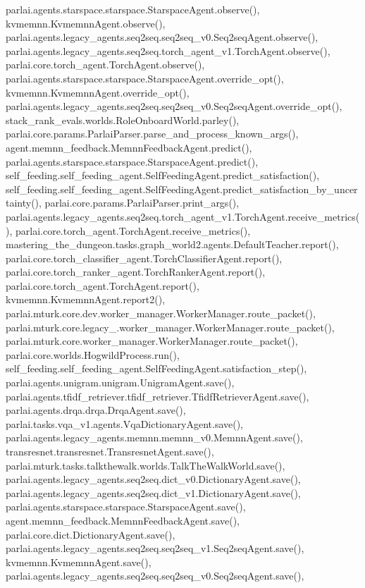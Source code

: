 parlai.\+agents.\+starspace.\+starspace.\+Starspace\+Agent.\+observe(), kvmemnn.\+Kvmemnn\+Agent.\+observe(), parlai.\+agents.\+legacy\+\_\+agents.\+seq2seq.\+seq2seq\+\_\+v0.\+Seq2seq\+Agent.\+observe(), parlai.\+agents.\+legacy\+\_\+agents.\+seq2seq.\+torch\+\_\+agent\+\_\+v1.\+Torch\+Agent.\+observe(), parlai.\+core.\+torch\+\_\+agent.\+Torch\+Agent.\+observe(), parlai.\+agents.\+starspace.\+starspace.\+Starspace\+Agent.\+override\+\_\+opt(), kvmemnn.\+Kvmemnn\+Agent.\+override\+\_\+opt(), parlai.\+agents.\+legacy\+\_\+agents.\+seq2seq.\+seq2seq\+\_\+v0.\+Seq2seq\+Agent.\+override\+\_\+opt(), stack\+\_\+rank\+\_\+evals.\+worlds.\+Role\+Onboard\+World.\+parley(), parlai.\+core.\+params.\+Parlai\+Parser.\+parse\+\_\+and\+\_\+process\+\_\+known\+\_\+args(), agent.\+memnn\+\_\+feedback.\+Memnn\+Feedback\+Agent.\+predict(), parlai.\+agents.\+starspace.\+starspace.\+Starspace\+Agent.\+predict(), self\+\_\+feeding.\+self\+\_\+feeding\+\_\+agent.\+Self\+Feeding\+Agent.\+predict\+\_\+satisfaction(), self\+\_\+feeding.\+self\+\_\+feeding\+\_\+agent.\+Self\+Feeding\+Agent.\+predict\+\_\+satisfaction\+\_\+by\+\_\+uncertainty(), parlai.\+core.\+params.\+Parlai\+Parser.\+print\+\_\+args(), parlai.\+agents.\+legacy\+\_\+agents.\+seq2seq.\+torch\+\_\+agent\+\_\+v1.\+Torch\+Agent.\+receive\+\_\+metrics(), parlai.\+core.\+torch\+\_\+agent.\+Torch\+Agent.\+receive\+\_\+metrics(), mastering\+\_\+the\+\_\+dungeon.\+tasks.\+graph\+\_\+world2.\+agents.\+Default\+Teacher.\+report(), parlai.\+core.\+torch\+\_\+classifier\+\_\+agent.\+Torch\+Classifier\+Agent.\+report(), parlai.\+core.\+torch\+\_\+ranker\+\_\+agent.\+Torch\+Ranker\+Agent.\+report(), parlai.\+core.\+torch\+\_\+agent.\+Torch\+Agent.\+report(), kvmemnn.\+Kvmemnn\+Agent.\+report2(), parlai.\+mturk.\+core.\+dev.\+worker\+\_\+manager.\+Worker\+Manager.\+route\+\_\+packet(), parlai.\+mturk.\+core.\+legacy\+\_.\+worker\+\_\+manager.\+Worker\+Manager.\+route\+\_\+packet(), parlai.\+mturk.\+core.\+worker\+\_\+manager.\+Worker\+Manager.\+route\+\_\+packet(), parlai.\+core.\+worlds.\+Hogwild\+Process.\+run(), self\+\_\+feeding.\+self\+\_\+feeding\+\_\+agent.\+Self\+Feeding\+Agent.\+satisfaction\+\_\+step(), parlai.\+agents.\+unigram.\+unigram.\+Unigram\+Agent.\+save(), parlai.\+agents.\+tfidf\+\_\+retriever.\+tfidf\+\_\+retriever.\+Tfidf\+Retriever\+Agent.\+save(), parlai.\+agents.\+drqa.\+drqa.\+Drqa\+Agent.\+save(), parlai.\+tasks.\+vqa\+\_\+v1.\+agents.\+Vqa\+Dictionary\+Agent.\+save(), parlai.\+agents.\+legacy\+\_\+agents.\+memnn.\+memnn\+\_\+v0.\+Memnn\+Agent.\+save(), transresnet.\+transresnet.\+Transresnet\+Agent.\+save(), parlai.\+mturk.\+tasks.\+talkthewalk.\+worlds.\+Talk\+The\+Walk\+World.\+save(), parlai.\+agents.\+legacy\+\_\+agents.\+seq2seq.\+dict\+\_\+v0.\+Dictionary\+Agent.\+save(), parlai.\+agents.\+legacy\+\_\+agents.\+seq2seq.\+dict\+\_\+v1.\+Dictionary\+Agent.\+save(), parlai.\+agents.\+starspace.\+starspace.\+Starspace\+Agent.\+save(), agent.\+memnn\+\_\+feedback.\+Memnn\+Feedback\+Agent.\+save(), parlai.\+core.\+dict.\+Dictionary\+Agent.\+save(), parlai.\+agents.\+legacy\+\_\+agents.\+seq2seq.\+seq2seq\+\_\+v1.\+Seq2seq\+Agent.\+save(), kvmemnn.\+Kvmemnn\+Agent.\+save(), parlai.\+agents.\+legacy\+\_\+agents.\+seq2seq.\+seq2seq\+\_\+v0.\+Seq2seq\+Agent.\+save(), 